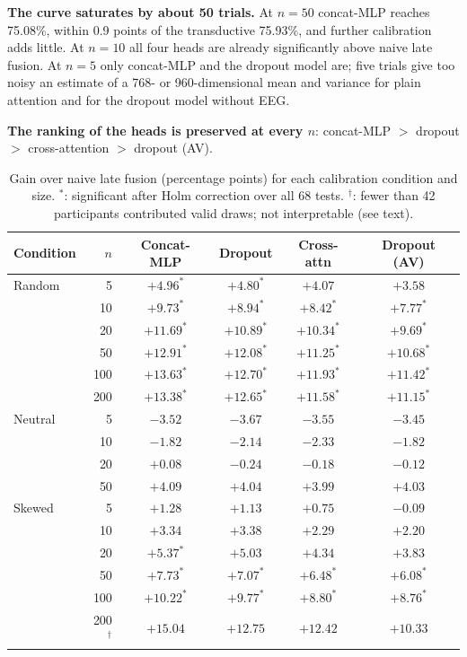 \textbf{The curve saturates by about 50 trials.} At $n = 50$ concat-MLP reaches
75.08\%, within 0.9 points of the transductive 75.93\%, and further calibration adds
little. At $n = 10$ all four heads are already significantly above naive late fusion.
At $n = 5$ only concat-MLP and the dropout model are; five trials give too noisy an
estimate of a 768- or 960-dimensional mean and variance for plain attention and for the dropout model without EEG.

\textbf{The ranking of the heads is preserved at every $n$}: concat-MLP $>$ dropout
$>$ cross-attention $>$ dropout (AV).

\begin{table}[htbp]
\centering
\small
\caption{Gain over naive late fusion (percentage points) for each calibration
condition and size. $^{*}$: significant after Holm correction over all 68 tests.
$^{\dagger}$: fewer than 42 participants contributed valid draws; not interpretable
(see text).}
\label{tab:cal_delta}
\begin{tabular}{lrcccc}
\hline
\textbf{Condition} & \textbf{$n$} & \textbf{Concat-MLP} & \textbf{Dropout} & \textbf{Cross-attn} & \textbf{Dropout (AV)} \\
\hline
Random  & 5   & $+4.96^{*}$  & $+4.80^{*}$  & $+4.07$      & $+3.58$ \\
        & 10  & $+9.73^{*}$  & $+8.94^{*}$  & $+8.42^{*}$  & $+7.77^{*}$ \\
        & 20  & $+11.69^{*}$ & $+10.89^{*}$ & $+10.34^{*}$ & $+9.69^{*}$ \\
        & 50  & $+12.91^{*}$ & $+12.08^{*}$ & $+11.25^{*}$ & $+10.68^{*}$ \\
        & 100 & $+13.63^{*}$ & $+12.70^{*}$ & $+11.93^{*}$ & $+11.42^{*}$ \\
        & 200 & $+13.38^{*}$ & $+12.65^{*}$ & $+11.58^{*}$ & $+11.15^{*}$ \\
\hline
Neutral & 5   & $-3.52$ & $-3.67$ & $-3.55$ & $-3.45$ \\
        & 10  & $-1.82$ & $-2.14$ & $-2.33$ & $-1.82$ \\
        & 20  & $+0.08$ & $-0.24$ & $-0.18$ & $-0.12$ \\
        & 50  & $+4.09$ & $+4.04$ & $+3.99$ & $+4.03$ \\
\hline
Skewed  & 5   & $+1.28$      & $+1.13$      & $+0.75$      & $-0.09$ \\
        & 10  & $+3.34$      & $+3.38$      & $+2.29$      & $+2.20$ \\
        & 20  & $+5.37^{*}$  & $+5.03$      & $+4.34$      & $+3.83$ \\
        & 50  & $+7.73^{*}$  & $+7.07^{*}$  & $+6.48^{*}$  & $+6.08^{*}$ \\
        & 100 & $+10.22^{*}$ & $+9.77^{*}$  & $+8.80^{*}$  & $+8.76^{*}$ \\
        & 200$^{\dagger}$ & $+15.04$ & $+12.75$ & $+12.42$ & $+10.33$ \\
\hline
\end{tabular}
\end{table}

